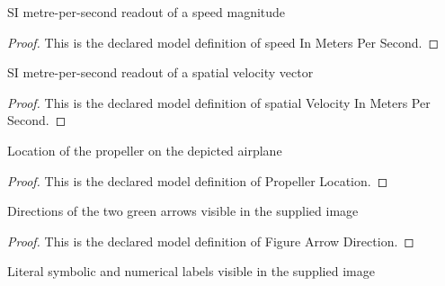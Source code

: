 \begin{definition}
  \label{def:physics:phyx-mini-0818:phyxminiproblems-problemphyxmini0818-speedinmeterspersecond}
  SI metre-per-second readout of a speed magnitude
\end{definition}
\begin{proof}
  This is the declared model definition of speed In Meters Per Second.
\end{proof}
\begin{definition}
  \label{def:physics:phyx-mini-0818:phyxminiproblems-problemphyxmini0818-spatialvelocityinmeterspersecond}
  SI metre-per-second readout of a spatial velocity vector
\end{definition}
\begin{proof}
  This is the declared model definition of spatial Velocity In Meters Per Second.
\end{proof}
\begin{definition}
  \label{def:physics:phyx-mini-0818:phyxminiproblems-problemphyxmini0818-propellerlocation}
  Location of the propeller on the depicted airplane
\end{definition}
\begin{proof}
  This is the declared model definition of Propeller Location.
\end{proof}
\begin{definition}
  \label{def:physics:phyx-mini-0818:phyxminiproblems-problemphyxmini0818-figurearrowdirection}
  Directions of the two green arrows visible in the supplied image
\end{definition}
\begin{proof}
  This is the declared model definition of Figure Arrow Direction.
\end{proof}
\begin{definition}
  \label{def:physics:phyx-mini-0818:phyxminiproblems-problemphyxmini0818-figurelabel}
  Literal symbolic and numerical labels visible in the supplied image
\end{definition}

